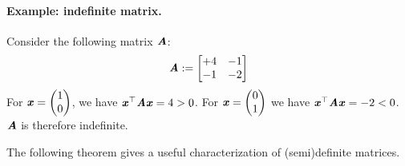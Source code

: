 
\paragraph{Example: indefinite matrix.} Consider the following matrix $\AA$:
\begin{displaymath}
    \AA:=\begin{bmatrix}
        +4 & -1\\
        -1 & -2
    \end{bmatrix}
  \end{displaymath}
For $\xx=
\begin{pmatrix}
  1 \\ 0
\end{pmatrix}$, we have $\xx^\trp  \AA \xx= 4 >0$. For $\xx=
\begin{pmatrix}
 0 \\ 1
\end{pmatrix}
$ we have $\xx^\trp  \AA \xx= -2< 0$. $\AA$ is therefore indefinite.

The following theorem gives a useful characterization of (semi)definite matrices.

